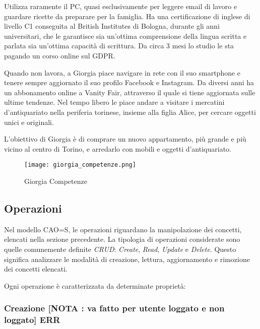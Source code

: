 \documentclass[12pt,italian,]{report}
\begin{document}
Utilizza raramente il PC, quasi esclusivamente per leggere email di
lavoro e guardare ricette da preparare per la famiglia. Ha una
certificazione di inglese di livello C1 conseguita al British Institutes
di Bologna, durante gli anni universitari, che le garantisce sia
un'ottima comprensione della lingua scritta e parlata sia un'ottima
capacità di scrittura. Da circa 3 mesi lo studio le sta pagando un corso
online sul GDPR.

Quando non lavora, a Giorgia piace navigare in rete con il suo
smartphone e tenere sempre aggiornato il suo profilo Facebook e
Instagram. Da diversi anni ha un abbonamento online a Vanity Fair,
attraverso il quale si tiene aggiornata sulle ultime tendenze. Nel tempo
libero le piace andare a visitare i mercatini d'antiquariato nella
periferia torinese, insieme alla figlia Alice, per cercare oggetti unici
e originali.

L'obiettivo di Giorgia è di comprare un nuovo appartamento, più grande e
più vicino al centro di Torino, e arredarlo con mobili e oggetti
d'antiquariato.

\begin{figure}
\centering
\texttt{[image: giorgia\_competenze.png]}
\caption{Giorgia Competenze}
\end{figure}

\hypertarget{operazioni}{%
\subsection{Operazioni}\label{operazioni}}

Nel modello CAO=S, le operazioni riguardano la manipolazione dei
concetti, elencati nella sezione precedente. La tipologia di operazioni
considerate sono quelle comunemente definite \emph{CRUD}: \emph{Create},
\emph{Read}, \emph{Update} e \emph{Delete}. Questo significa analizzare
le modalità di creazione, lettura, aggiornamento e rimozione dei
concetti elencati.

Ogni operazione è caratterizzata da determinate proprietà:

\hypertarget{creazione-nota-va-fatto-per-utente-loggato-e-non-loggato-err}{%
\subsubsection{Creazione {[}NOTA : va fatto per utente loggato e non
loggato{]}
ERR}\label{creazione-nota-va-fatto-per-utente-loggato-e-non-loggato-err}}
\end{document}
